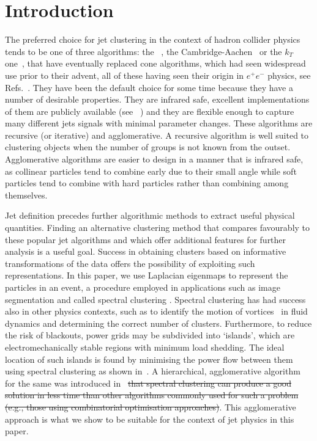 \section{Introduction}\label{sec:JetClustering}

The preferred choice for jet clustering in the context of hadron collider physics tends to be one of three algorithms:  
the \antikt{}~\cite{Cacciari2008akt}, the Cambridge-Aachen~\cite{Dokshitzer:1997in,Wobisch1998caJet} or the $k_T$  one~\cite{Ellis1993ktJet}, that have  eventually replaced cone algorithms, which had seen widespread use prior to their advent, all of these having seen  their origin in $e^+e^-$ physics, see  Refs.~\cite{Sterman:1977wj,Bethke:1991wk,Catani:1991hj,Moretti:1998qx}.
They have been the default choice for some time because they have a number of desirable properties.
They are infrared safe, excellent implementations of them are publicly available (see \fastjet{}~\cite{Cacciari2011FastJet})
and they are flexible enough to capture many different jets signals with minimal parameter changes.
These algorithms are recursive (or iterative) and agglomerative.
A recursive algorithm is well suited to clustering objects when the number of groups is not known from the outset.
Agglomerative algorithms are easier to design in a manner that is infrared safe,
as collinear particles tend to combine early due to their small angle while
 soft particles tend to combine with hard particles rather than combining  among themselves.

{\color{magenta}  Jet definition precedes further algorithmic methods to extract useful
physical quantities. Finding an alternative clustering method that compares favourably to
these popular jet algorithms and which offer additional features for further analysis is a
useful goal. Success in obtaining clusters based on informative transformations of the data
offers the possibility of exploiting such representations.
In this paper, we use Laplacian eigenmaps \cite{BelkinNiyogi2003} to represent the particles
in an event, a procedure employed in applications such as image segmentation \cite{ShiMalik1997}
and called spectral clustering \cite{NgJordanWeiss2002}.}
Spectral clustering has had success also in other physics contexts, such as to identify the motion
of vortices~\cite{hadjighasem2016votex} in fluid dynamics and determining the correct number of clusters.
Furthermore, to reduce the risk of blackouts, power grids may be subdivided into `islands',
which are
electromechanically stable regions with minimum load shedding.
The ideal location of such islands is found by minimising the power flow between them using spectral clustering {\color{magenta}as shown in~\cite{Li2005}.  A hierarchical, agglomerative algorithm for the same was introduced} in~\cite{fennelly2014power} \sout{that spectral clustering
can produce a good solution in less time than other algorithms commonly used for such a problem (e.g., those using combinatorial optimisation approaches)}. {\color{magenta} This agglomerative approach is what we show to be suitable for the context of jet physics in this paper.} 


